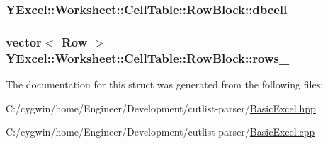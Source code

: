 \subsubsection[{dbcell\+\_\+}]{ Y\+Excel\+::\+Worksheet\+::\+Cell\+Table\+::\+Row\+Block\+::dbcell\+\_\+}\label{struct_y_excel_1_1_worksheet_1_1_cell_table_1_1_row_block_ac1f614beda20240ce056caecf719355f}
\hypertarget{struct_y_excel_1_1_worksheet_1_1_cell_table_1_1_row_block_a3b4cd53b737192b972a06059b38ad7be}{}
\subsubsection[{rows\+\_\+}]{\setlength{\rightskip}{0pt plus 5cm}vector$<$ {\bf Row} $>$ Y\+Excel\+::\+Worksheet\+::\+Cell\+Table\+::\+Row\+Block\+::rows\+\_\+}\label{struct_y_excel_1_1_worksheet_1_1_cell_table_1_1_row_block_a3b4cd53b737192b972a06059b38ad7be}


The documentation for this struct was generated from the following files\+:\begin{DoxyCompactItemize}
\item 
C\+:/cygwin/home/\+Engineer/\+Development/cutlist-\/parser/\hyperlink{_basic_excel_8hpp}{Basic\+Excel.\+hpp}\item 
C\+:/cygwin/home/\+Engineer/\+Development/cutlist-\/parser/\hyperlink{_basic_excel_8cpp}{Basic\+Excel.\+cpp}\end{DoxyCompactItemize}
